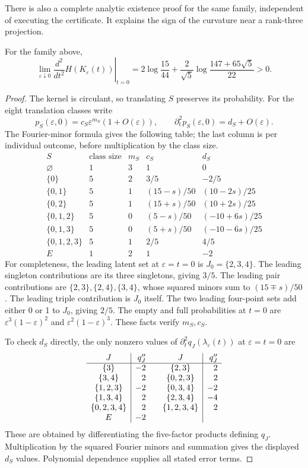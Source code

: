 \begin{cxrefutation}
There is also a complete analytic existence proof for the same family,
independent of executing the certificate. It explains the sign of the
curvature near a rank-three projection.

\begin{proposition}
For the family above,
\[
 \lim_{\varepsilon\downarrow0}
 \left.\frac{d^2}{dt^2}H(K_\varepsilon(t))\right|_{t=0}
 =2\log\frac{15}{44}
  +\frac2{\sqrt5}\log\frac{147+65\sqrt5}{22}>0.
\]
\end{proposition}
\begin{proof}
The kernel is circulant, so translating $S$ preserves its probability. For
the eight translation classes write
\[
 p_S(\varepsilon,0)=c_S\varepsilon^{m_S}(1+O(\varepsilon)),\qquad
 \partial_t^2p_S(\varepsilon,0)=d_S+O(\varepsilon).
\]
The Fourier-minor formula gives the following table; the last column is per
individual outcome, before multiplication by the class size.
\[
\begin{array}{c|r|r|c|c}
 S&\text{class size}&m_S&c_S&d_S\\\hline
 \varnothing&1&3&1&0\\
 \{0\}&5&2&3/5&-2/5\\
 \{0,1\}&5&1&(15-s)/50&(10-2s)/25\\
 \{0,2\}&5&1&(15+s)/50&(10+2s)/25\\
 \{0,1,2\}&5&0&(5-s)/50&(-10+6s)/25\\
 \{0,1,3\}&5&0&(5+s)/50&(-10-6s)/25\\
 \{0,1,2,3\}&5&1&2/5&4/5\\
 E&1&2&1&-2
\end{array}
\]
For completeness, the leading latent set at $\varepsilon=t=0$ is
$J_0=\{2,3,4\}$. The leading singleton contributions are its three
singletons, giving $3/5$. The leading pair contributions are
$\{2,3\},\{2,4\},\{3,4\}$, whose squared minors sum to
$(15\mp s)/50$. The leading triple contribution is $J_0$ itself. The two
leading four-point sets add either 0 or 1 to $J_0$, giving $2/5$.
The empty and full probabilities at $t=0$ are
$\varepsilon^3(1-\varepsilon)^2$ and
$\varepsilon^2(1-\varepsilon)^3$. These facts verify $m_S,c_S$.

To check $d_S$ directly, the only nonzero values of
$\partial_t^2q_J(\lambda_\varepsilon(t))$ at $\varepsilon=t=0$ are
\[
\begin{array}{c|r@{\qquad}c|r}
 J&q_J''&J&q_J''\\\hline
 \{3\}&-2&\{2,3\}&2\\
 \{3,4\}&2&\{0,2,3\}&2\\
 \{1,2,3\}&-2&\{0,3,4\}&-2\\
 \{1,3,4\}&2&\{2,3,4\}&-4\\
 \{0,2,3,4\}&2&\{1,2,3,4\}&2\\
 E&-2&&
\end{array}
\]
These are obtained by differentiating the five-factor products defining
$q_J$. Multiplication by the squared Fourier minors and summation gives
the displayed $d_S$ values. Polynomial dependence supplies all stated
error terms.


\end{proof}
\end{cxrefutation}
